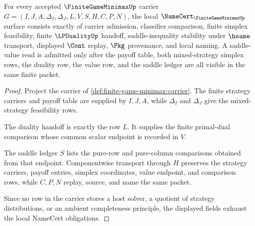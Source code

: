 \begin{theorem}
\label{thm:finite-game-minimax-obligation-surface}
For every accepted $\FiniteGameMinimaxUp$ carrier $G=(I,J,A,\Delta_I,\Delta_J,L,V,S,H,C,P,N)$, the local $\NameCert_{\FiniteGameMinimaxUp}$ surface consists exactly of carrier admission, classifier comparison, finite simplex feasibility, finite $\LPDualityUp$ handoff, saddle-inequality stability under $\hsame$ transport, displayed $\Cont$ replay, $\Pkg$ provenance, and local naming. A saddle-value read is admitted only after the payoff table, both mixed-strategy simplex rows, the duality row, the value row, and the saddle ledger are all visible in the same finite packet.
\end{theorem}
\begin{proof}
Project the carrier of \autoref{def:finite-game-minimax-carrier}. The finite strategy carriers and payoff table are supplied by $I,J,A$, while $\Delta_I$ and $\Delta_J$ give the mixed-strategy feasibility rows.

The duality handoff is exactly the row $L$. It supplies the finite primal-dual comparison whose common scalar endpoint is recorded in $V$.

The saddle ledger $S$ lists the pure-row and pure-column comparisons obtained from that endpoint. Componentwise transport through $H$ preserves the strategy carriers, payoff entries, simplex coordinates, value endpoint, and comparison rows, while $C,P,N$ replay, source, and name the same packet.

Since no row in the carrier stores a host solver, a quotient of strategy distributions, or an ambient completeness principle, the displayed fields exhaust the local NameCert obligations.
\end{proof}

